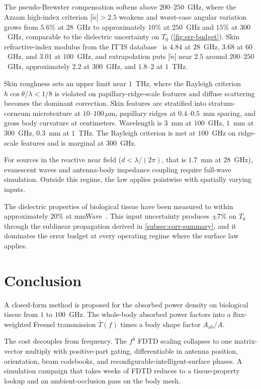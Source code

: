 \documentclass[journal,twocolumn,10pt]{IEEEtran}
\theoremstyle{plain}
\newcommand{\Aab}{A_{\mathrm{ab}}}
\newcommand{\Tbar}{\bar{T}}
\newcommand{\ntilde}{\tilde{n}}
\begin{document}
The pseudo-Brewster compensation softens above $200$--$250$~GHz,
where the Azzam high-index criterion $|\ntilde| > 2.5$ weakens and
worst-case angular variation grows from $5.6\%$ at $28$~GHz to
approximately $10\%$ at $250$~GHz and $15\%$ at $300$~GHz, comparable
to the dielectric uncertainty on $T_0$ (\cref{fig:err-budget}). Skin
refractive-index modulus from the IT'IS database~\cite{ITISv5,Gabriel1996} is $4.84$ at $28$~GHz,
$3.68$ at $60$~GHz, and $3.01$ at $100$~GHz, and extrapolation puts
$|\ntilde|$ near $2.5$ around $200$--$250$~GHz, approximately $2.2$
at $300$~GHz, and $1.8$--$2$ at $1$~THz.

Skin roughness sets an upper limit near $1$~THz, where the Rayleigh
criterion $h\cos\theta/\lambda < 1/8$ is violated on
papillary-ridge-scale features and diffuse scattering becomes the
dominant correction. Skin features are stratified into
stratum-corneum microtexture at $10$--$100\,\mu$m, papillary ridges
at $0.4$--$0.5$~mm spacing, and gross body curvature at centimeters.
Wavelength is $3$~mm at $100$~GHz, $1$~mm at $300$~GHz, $0.3$~mm at
$1$~THz. The Rayleigh criterion is met at $100$~GHz on ridge-scale
features and is marginal at $300$~GHz.

For sources in the reactive near field ($d < \lambda/(2\pi)$, that is
$1.7$~mm at $28$~GHz), evanescent waves and antenna-body impedance
coupling require full-wave simulation. Outside this regime, the law
applies pointwise with spatially varying inputs.

The dielectric properties of biological tissue have been measured to
within approximately $20\%$ at mmWave~\cite{AlekseevZiskin2007}. This
input uncertainty produces $\pm 7\%$ on $T_0$ through the sublinear
propagation derived in \cref{subsec:corr-summary}, and it dominates
the error budget at every operating regime where the surface law
applies.

\section{Conclusion}\label{sec:conc}

A closed-form method is proposed for the absorbed power density on
biological tissue from $1$ to $100$~GHz. The whole-body absorbed
power factors into a flux-weighted Fresnel transmission $\Tbar(f)$
times a body shape factor $\Aab/A$.

The cost decouples from frequency. The $f^4$ FDTD scaling collapses
to one matrix-vector multiply with positive-part gating,
differentiable in antenna position, orientation, beam codebooks, and
reconfigurable-intelligent-surface phases. A simulation campaign
that takes weeks of FDTD reduces to a tissue-property lookup and an
ambient-occlusion pass on the body mesh.
\end{document}
